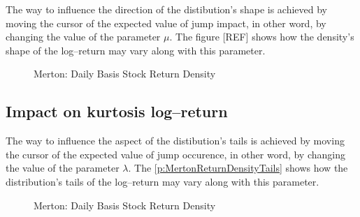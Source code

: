 \documentclass[12pt]{report}
\begin{document}
The way to influence the direction of the distibution's shape is achieved by moving the cursor of the expected value of jump impact, in other word, by changing the value of the parameter $\mu$. The figure [REF] shows how the density's shape of the log--return may vary along with this parameter.


\begin{figure}[ht]
\centering

\caption{Merton: Daily Basis Stock Return Density}
\label{plot:MertonReturnDensity}
\end{figure}

\subsection{Impact on kurtosis log--return}
\label{sub:MertonKurtosis}

The way to influence the aspect of the distibution's tails is achieved by moving the cursor of the expected value of jump occurence, in other word, by changing the value of the parameter $\lambda$. The \cref{p:MertonReturnDensityTails} shows how the distribution's tails of the log--return may vary along with this parameter.

\begin{figure}[ht]
\centering

\caption{Merton: Daily Basis Stock Return Density}
\label{plot:MertonReturnDensityTails}
\end{figure}
\end{document}
